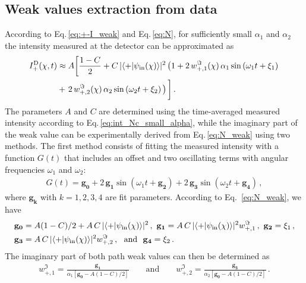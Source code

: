 \documentclass[12pt]{iopart}
\newcommand{\eq}{Eq.}
\begin{document}
\subsection{Weak values extraction from data}\label{subsec:WvExtrData}
According to \eq\,\eqref{eq:+-I_weak} and \eq\,\eqref{eq:N}, for sufficiently small $\alpha_1$ and $\alpha_2$  the intensity measured at the detector can be approximated as
\begin{align}
\begin{aligned}
    I^{\mathrm{D}}_+(\chi, t) &\approx
     A\bigg[\frac{1-C}{2} + C \, \lvert\braket{+|\psi_\mathrm{in}(\chi)}\rvert^2 \left(1 + 2\, w^\Im_{+,1}(\chi)\,\alpha_1 \sin\left( \omega_1 t + \xi_1\right)\right. \\&+ \left. 2\, w^\Im_{+,2}(\chi)\,\alpha_2 \sin\left( \omega_2 t+\xi_2\right)\,\right)\bigg] \, .
    \label{eq:N_weak}
\end{aligned}
\end{align}
The parameters $A$ and $C$ are determined using the time-averaged measured intensity according to \eq\,\eqref{eq:int_Nc_small_alpha}, while the imaginary part of the weak value can be experimentally derived from \eq\,\eqref{eq:N_weak} using two methods. The first method consists of fitting the measured intensity with a function $G(t)$ that includes an offset and two oscillating terms with angular frequencies $\omega_1$ and $\omega_2$:
\begin{align}
    G(t)= \mathbf{g_0}+2\,\mathbf{g_1} \sin\left( \omega_1 t + \mathbf{g_2}\right) + 2\,\mathbf{g_3} \sin\left(\omega_2 t+\mathbf{g_4}\right)\, ,
\end{align}
where $\mathbf{g_k}$ with $k=1,2,3,4$ are fit parameters. According to \eq~\eqref{eq:N_weak}, we have
\begin{align}
\begin{aligned}
    \mathbf{g_0}&=A(1-C)/2 + A \, C \, \lvert\braket{+|\psi_\mathrm{in}(\chi)}\rvert^2\, ,\
    \mathbf{g_1}=A \, C \, \lvert\braket{+|\psi_\mathrm{in}(\chi)}\rvert^2 w^\Im_{+,1}\, , \
    \mathbf{g_2}=\xi_1\, , \\
    \mathbf{g_3}&=A \, C \, \lvert\braket{+|\psi_\mathrm{in}(\chi)}\rvert^2 w^\Im_{+,2}\, , \ \ \mathrm{and}\ \
    \mathbf{g_4}=\xi_2\, .
\end{aligned}
\end{align}
The imaginary part of both path weak values can then be determined as
\begin{align}
         w^\Im_{+,1} = \frac{\mathbf{g_1}}{\alpha_1\left[\mathbf{g_0}-A(1-C)/2\right]} \qquad \mathrm{and} \qquad
         w^\Im_{+,2} = \frac{\mathbf{g_3}}{\alpha_2\left[\mathbf{g_0}-A(1-C)/2\right]}\, .\label{eq:Im_fit}
\end{align}
\end{document}
